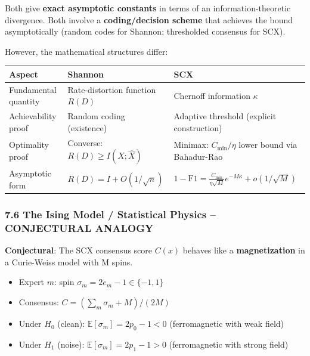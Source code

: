 \documentclass[
  12pt,
]{ctexart}
\providecommand{\tightlist}{%
  \setlength{\itemsep}{0pt}\setlength{\parskip}{0pt}}
\begin{document}
Both give \textbf{exact asymptotic constants} in terms of an
information-theoretic divergence. Both involve a \textbf{coding/decision
scheme} that achieves the bound asymptotically (random codes for
Shannon; thresholded consensus for SCX).

However, the mathematical structures differ:

\begin{longtable}[]{@{}
  >{\raggedright\arraybackslash}p{}
  >{\raggedright\arraybackslash}p{}
  >{\raggedright\arraybackslash}p{}@{}}
\toprule\noalign{}
\begin{minipage}[b]{\linewidth}\raggedright
Aspect
\end{minipage} & \begin{minipage}[b]{\linewidth}\raggedright
Shannon
\end{minipage} & \begin{minipage}[b]{\linewidth}\raggedright
SCX
\end{minipage} \\
\midrule\noalign{}
\endhead
\bottomrule\noalign{}
\endlastfoot
Fundamental quantity & Rate-distortion function \(R(D)\) & Chernoff
information \(\kappa\) \\
Achievability proof & Random coding (existence) & Adaptive threshold
(explicit construction) \\
Optimality proof & Converse: \(R(D) \geq I(X;\hat{X})\) & Minimax:
\(C_{\min}/\eta\) lower bound via Bahadur-Rao \\
Asymptotic form & \(R(D) = I + O(1/\sqrt{n})\) &
\(1 - \text{F1} = \frac{C_{\min}}{\eta\sqrt{M}} e^{-M\kappa} + o(1/\sqrt{M})\) \\
\end{longtable}

\subsubsection{7.6 The Ising Model / Statistical Physics -- CONJECTURAL
ANALOGY}\label{the-ising-model-statistical-physics-conjectural-analogy}

\textbf{Conjectural}: The SCX consensus score \(C(x)\) behaves like a
\textbf{magnetization} in a Curie-Weiss model with M spins.

\begin{itemize}
\tightlist
\item
  Expert \(m\): spin \(\sigma_m = 2e_m - 1 \in \{-1, 1\}\)
\item
  Consensus: \(C = (\sum_m \sigma_m + M) / (2M)\)
\item
  Under \(H_0\) (clean): \(\mathbb{E}[\sigma_m] = 2p_0 - 1 < 0\)
  (ferromagnetic with weak field)
\item
  Under \(H_1\) (noise): \(\mathbb{E}[\sigma_m] = 2p_1 - 1 > 0\)
  (ferromagnetic with strong field)
\end{itemize}
\end{document}
